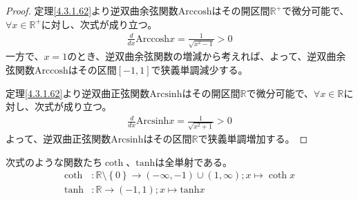 \documentclass[dvipdfmx]{jsarticle}
\begin{document}
\begin{proof} 定理\ref{4.3.1.62}より逆双曲余弦関数$\mathrm{Arccosh}$はその開区間$\mathbb{R}^{+}$で微分可能で、$\forall x \in \mathbb{R}^{+}$に対し、次式が成り立つ。
\begin{align*}
\frac{d}{dx}{\mathrm{Arccosh}}x = \frac{1}{\sqrt{x^{2} - 1}} > 0
\end{align*}
一方で、$x = 1$のとき、逆双曲余弦関数の増減から考えれば、よって、逆双曲余弦関数$\mathrm{Arccosh}$はその区間$[ - 1,1]$で狭義単調減少する。\par
定理\ref{4.3.1.62}より逆双曲正弦関数$\mathrm{Arcsinh}$はその開区間$\mathbb{R}$で微分可能で、$\forall x \in \mathbb{R}$に対し、次式が成り立つ。
\begin{align*}
\frac{d}{dx}{\mathrm{Arcsinh}}x = \frac{1}{\sqrt{x^{2} + 1}} > 0
\end{align*}
よって、逆双曲正弦関数$\mathrm{Arcsinh}$はその区間$\mathbb{R}$で狭義単調増加する。
\end{proof}
\begin{thm}\label{4.3.1.64} 次式のような関数たち$\coth$、$\mathrm{tanh}$は全単射である。
\begin{align*}
\coth&:\mathbb{R} \setminus \left\{ 0 \right\} \rightarrow ( - \infty, - 1) \cup (1,\infty);x \mapsto \coth x\\
\mathrm{tanh}&:\mathbb{R} \rightarrow ( - 1,1);x \mapsto \mathrm{tanh} x
\end{align*}
\end{thm}
\end{document}
